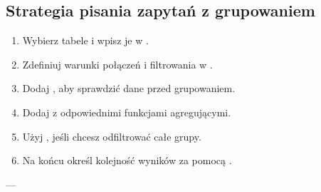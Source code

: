 \subsection{Strategia pisania zapytań z grupowaniem}
\begin{enumerate}
    \item Wybierz tabele i wpisz je w .
    \item Zdefiniuj warunki połączeń i filtrowania w .
    \item Dodaj , aby sprawdzić dane przed grupowaniem.
    \item Dodaj  z odpowiednimi funkcjami agregującymi.
    \item Użyj , jeśli chcesz odfiltrować całe grupy.
    \item Na końcu określ kolejność wyników za pomocą .
\end{enumerate}

---

